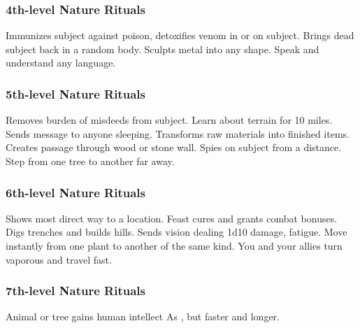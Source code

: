 \subsubsection{4th-level Nature Rituals}
\begin{rituallist}
     Immunizes subject against poison, detoxifies venom in or on subject.
     Brings dead subject back in a random body.
     Sculpts metal into any shape.
     Speak and understand any language.
\end{rituallist}

\subsubsection{5th-level Nature Rituals}
\begin{rituallist}
    \F\M Removes burden of misdeeds from subject.
     Learn about terrain for 10 miles.
     Sends message to anyone sleeping.
     Transforms raw materials into finished items.
     Creates passage through wood or stone wall.
    \F Spies on subject from a distance.
     Step from one tree to another far away.
\end{rituallist}

\subsubsection{6th-level Nature Rituals}
\begin{rituallist}
     Shows most direct way to a location.
     Feast cures and grants combat bonuses.
     Digs trenches and builds hills.
     Sends vision dealing 1d10 damage, fatigue.
     Move instantly from one plant to another of the same kind.
     You and your allies turn vaporous and travel fast.
\end{rituallist}

\subsubsection{7th-level Nature Rituals}
\begin{rituallist}
     Animal or tree gains human intellect
     As , but faster and longer.
\end{rituallist}

